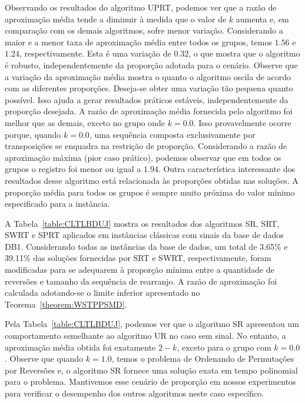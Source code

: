 Observando os resultados do algoritmo UPRT, podemos ver que a razão de aproximação média tende a diminuir à medida que o valor de $k$ aumenta e, em comparação com os demais algoritmos, sofre menor variação. Considerando a maior e a menor taxa de aproximação média entre todos os grupos, temos $1.56$ e $1.24$, respectivamente. Esta é uma variação de $0.32$, o que mostra que o algoritmo é robusto, independentemente da proporção adotada para o cenário. Observe que a variação da aproximação média mostra o quanto o algoritmo oscila de acordo com as diferentes proporções. Deseja-se obter uma variação tão pequena quanto possível. Isso ajuda a gerar resultados práticos estáveis, independentemente da proporção desejada. A razão de aproximação média fornecida pelo algoritmo foi melhor que as demais, exceto no grupo onde $k = 0.0$. Isso provavelmente ocorre porque, quando $k = 0.0$, uma sequência composta exclusivamente por transposições se enquadra na restrição de proporção. Considerando a razão de aproximação máxima (pior caso prático), podemos observar que em todos os grupos o registro foi menor ou igual a $1.94$. Outra característica interessante dos resultados desse algoritmo está relacionada às proporções obtidas nas soluções. A proporção média para todos os grupos é sempre muito próxima do valor mínimo especificado para a instância.

A Tabela~\ref{table:CLTLBDUJ} mostra os resultados dos algoritmos SR, SRT, SWRT e SPRT aplicados em instâncias clássicas com sinais da base de dados DB1. Considerando todas as instâncias da base de dados, um total de 3.65\% e 39.11\% das soluções fornecidas por SRT e SWRT, respectivamente, foram modificadas para se adequarem à proporção mínima entre a quantidade de reversões e tamanho da sequência de rearranjo. A razão de aproximação foi calculada adotando-se o limite inferior apresentado no Teorema~\ref{theorem:WSTPPSMD}.



Pela Tabela~\ref{table:CLTLBDUJ}, podemos ver que o algoritmo SR apresentou um comportamento semelhante ao algoritmo UR no caso sem sinal. No entanto, a aproximação média obtida foi exatamente $2 - k$, exceto para o grupo com $k = 0.0$. Observe que quando $k=1.0$, temos o problema de Ordenando de Permutações por Reversões e, o algoritmo SR fornece uma solução exata em tempo polinomial para o problema. Mantivemos esse cenário de proporção em nossos experimentos para verificar o desempenho dos outros algoritmos neste caso específico.

